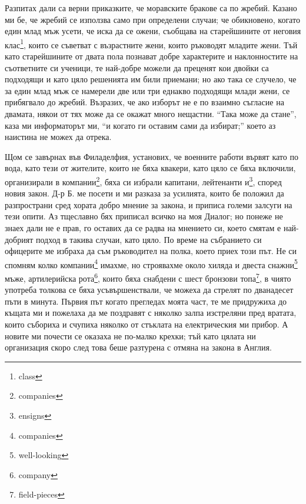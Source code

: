 \documentclass[12pt]{book}
\begin{document}
Разпитах дали са верни приказките, че моравските бракове са по жребий. Казано ми бе, че жребий се използва само при определени случаи; че обикновено, когато един млад мъж усети, че иска да се ожени, съобщава на старейшините от неговия клас\footnote{class}, които се съветват с възрастните жени, които ръководят младите жени. Тъй като старейшините от двата пола познават добре характерите и наклонностите на съответните си ученици, те най-добре можели да преценят кои двойки са подходящи и като цяло решенията им били приемани; но ако така се случело, че за един млад мъж се намерели две или три еднакво подходящи млади жени, се прибягвало до жребий. Възразих, че ако изборът не е по взаимно съгласие на двамата, някои от тях може да се окажат много нещастни. “Така може да стане”, каза ми информаторът ми, “и когато ги оставим сами да избират;” което аз наистина не можех да отрека. 

Щом се завърнах във Филаделфия, установих, че военните работи вървят като по вода, като тези от жителите, които не бяха квакери, като цяло се бяха включили, организирали в компании\footnote{companies}, бяха си избрали капитани, лейтенанти и\footnote{ensigns}, според новия закон. Д-р Б. ме посети и ми разказа за усилията, които бе положил да разпространи сред хората добро мнение за закона, и приписа големи залсуги на тези опити. Аз тщеславно бях приписал всичко на моя Диалог; но понеже не знаех дали не е прав, го оставих да се радва на мнението си, което смятам е най-добрият подход в такива случаи, като цяло. По време на събранието си офицерите ме избраха да съм ръководител на полка, което приех този път. Не си спомням колко компании\footnote{companies} имахме, но строявахме около хиляда и двеста снажни\footnote{well-looking} мъже, артилерийска рота\footnote{company}, които бяха снабдени с шест бронзови топа\footnote{field-pieces}, в чиято употреба толкова се бяха усъвършенствали, че можеха да стрелят по дванадесет пъти в минута. Първия път когато прегледах моята част, те ме придружиха до къщата ми и пожелаха да ме поздравят с няколко залпа изстреляни пред вратата, които събориха и счупиха няколко от стъклата на електрическия ми прибор. А новите ми почести се оказаха не по-малко крехки; тъй като цялата ни организация скоро след това беше разтурена с отмяна на закона в Англия. 
\end{document}
